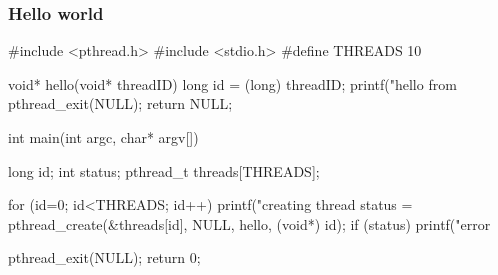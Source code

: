 %
%
%
%


\begin{frame}[fragile]
%
  \frametitle{Hello world}
  \label{slide:hello-world}
%
  \begin{C}
#include <pthread.h>
#include <stdio.h>
#define THREADS 10

void* hello(void* threadID) {
    long id = (long) threadID;
    printf("hello from %
    pthread_exit(NULL);
    return NULL;
}

int main(int argc, char* argv[]) {
    long id;
    int status;
    pthread_t threads[THREADS];

    for (id=0; id<THREADS; id++) {
        printf("creating thread %
        status = pthread_create(&threads[id], NULL, hello, (void*) id);
        if (status) {
            printf("error %
        }
    }

    pthread_exit(NULL);
    return 0;
}
  \end{C}
%
\end{frame}

